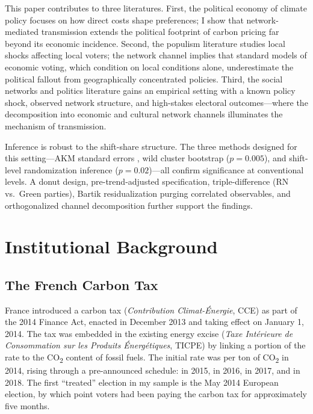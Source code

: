 \documentclass[12pt]{article}
\providecommand{\euro}{\texteuro}
\begin{document}
This paper contributes to three literatures. First, the political economy of climate policy \citep{douenne2022yellow, klenert2018carbon, stantcheva2022understanding} focuses on how direct costs shape preferences; I show that network-mediated transmission extends the political footprint of carbon pricing far beyond its economic incidence. Second, the populism literature \citep{autor2013china, rodrik2021populism, colantone2023global, funke2016going} studies local shocks affecting local voters; the network channel implies that standard models of economic voting, which condition on local conditions alone, underestimate the political fallout from geographically concentrated policies. Third, the social networks and politics literature \citep{bond2012experiment, enikolopov2020social, allcott2017social, fluckiger2025bro, chetty2022social1} gains an empirical setting with a known policy shock, observed network structure, and high-stakes electoral outcomes---where the decomposition into economic and cultural network channels illuminates the mechanism of transmission.

Inference is robust to the shift-share structure. The three methods designed for this setting---AKM standard errors \citep{adao2019shift}, wild cluster bootstrap ($p = 0.005$), and shift-level randomization inference ($p = 0.02$)---all confirm significance at conventional levels. A donut design, pre-trend-adjusted specification, triple-difference (RN vs.\ Green parties), Bartik residualization purging correlated observables, and orthogonalized channel decomposition further support the findings.



\section{Institutional Background}
\label{sec:background}

\subsection{The French Carbon Tax}

France introduced a carbon tax (\textit{Contribution Climat-\'{E}nergie}, CCE) as part of the 2014 Finance Act, enacted in December 2013 and taking effect on January 1, 2014. The tax was embedded in the existing energy excise (\textit{Taxe Int\'{e}rieure de Consommation sur les Produits \'{E}nerg\'{e}tiques}, TICPE) by linking a portion of the rate to the CO\textsubscript{2} content of fossil fuels. The initial rate was \euro 7 per ton of CO\textsubscript{2} in 2014, rising through a pre-announced schedule: \euro 14.50 in 2015, \euro 22 in 2016, \euro 30.50 in 2017, and \euro 44.60 in 2018. The first ``treated'' election in my sample is the May 2014 European election, by which point voters had been paying the carbon tax for approximately five months.
\end{document}
